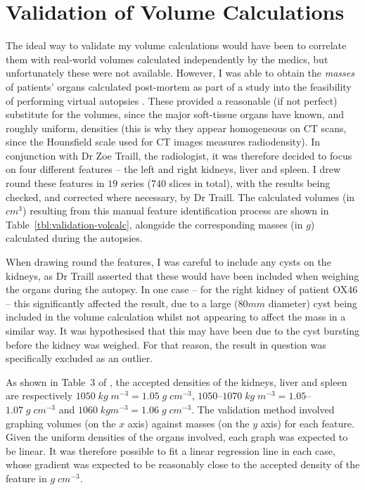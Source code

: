 \afterpage{\clearpage}
\newpage

\section{Validation of Volume Calculations}

The ideal way to validate my volume calculations would have been to correlate them with real-world volumes calculated independently by the medics, but unfortunately these were not available. However, I was able to obtain the \emph{masses} of patients' organs calculated post-mortem as part of a study into the feasibility of performing virtual autopsies \cite{?}. These provided a reasonable (if not perfect) substitute for the volumes, since the major soft-tissue organs have known, and roughly uniform, densities (this is why they appear homogeneous on CT scans, since the Hounsfield scale used for CT images measures radiodensity). In conjunction with Dr Zoe Traill, the radiologist, it was therefore decided to focus on four different features -- the left and right kidneys, liver and spleen. I drew round these features in $19$ series ($740$ slices in total), with the results being checked, and corrected where necessary, by Dr Traill. The calculated volumes (in $\mathit{cm}^3$) resulting from this manual feature identification process are shown in Table~\ref{tbl:validation-volcalc}, alongside the corresponding masses (in $g$) calculated during the autopsies.

When drawing round the features, I was careful to include any cysts on the kidneys, as Dr Traill asserted that these would have been included when weighing the organs during the autopsy. In one case -- for the right kidney of patient OX46 -- this significantly affected the result, due to a large ($80\mathit{mm}$ diameter) cyst being included in the volume calculation whilst not appearing to affect the mass in a similar way. It was hypothesised that this may have been due to the cyst bursting before the kidney was weighed. For that reason, the result in question was specifically excluded as an outlier.

As shown in Table~$3$ of \cite{woodard86}, the accepted densities of the kidneys, liver and spleen are respectively $1050 \; \mathit{kg} \; m^{-3} = 1.05 \; g \; \mathit{cm}^{-3}$, $1050$--$1070 \; \mathit{kg} \; m^{-3} = 1.05$--$1.07 \; g \; \mathit{cm}^{-3}$ and $1060 \; \mathit{kg} m^{-3} = 1.06 \; g \; \mathit{cm}^{-3}$. The validation method involved graphing volumes (on the $x$ axis) against masses (on the $y$ axis) for each feature. Given the uniform densities of the organs involved, each graph was expected to be linear. It was therefore possible to fit a linear regression line in each case, whose gradient was expected to be reasonably close to the accepted density of the feature in $g \; \mathit{cm}^{-3}$.

